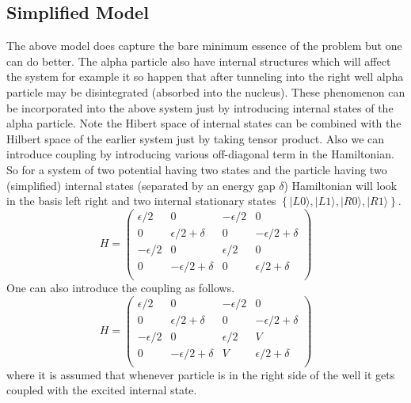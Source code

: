 \documentclass[a4paper,two column]{article}
\begin{document}
            \subsection{Simplified Model}\label{subsec:simplifiedmodel}
                The above model does capture the bare minimum essence of the problem but one can do better. The alpha particle also have internal structures which will affect the system for example it so happen that after tunneling into the right well alpha particle may be disintegrated (absorbed into the nucleus). These phenomenon can be incorporated into the above system just by introducing internal states of the alpha particle. Note the Hibert space of internal states can be combined with the Hilbert space of the earlier system just by taking tensor product. Also we can introduce coupling by introducing various off-diagonal term in the Hamiltonian.
                So for a system of two potential having two states and the particle having two (simplified) internal states (separated by an energy gap $\delta$) Hamiltonian will look in the basis left right and two internal stationary states $\left\{|L0\rangle,|L1\rangle,|R0\rangle,|R1\rangle\right\}$.
                \begin{equation}
                    H  = \begin{pmatrix}
                        \epsilon/2&0&-\epsilon/2&0\\
                        0&\epsilon/2 + \delta &0&-\epsilon/2 + \delta\\
                        -\epsilon/2&0&\epsilon/2&0\\
                        0&-\epsilon/2 + \delta &0&\epsilon/2 + \delta\\
                    \end{pmatrix}
                \end{equation}
                One can also introduce the coupling as follows.
                \begin{equation}\label{Hamiltonian}
                    H = \begin{pmatrix}
                        \epsilon/2&0&-\epsilon/2&0\\
                        0&\epsilon/2 + \delta &0&-\epsilon/2 + \delta\\
                        -\epsilon/2&0&\epsilon/2&V\\
                        0&-\epsilon/2 + \delta &V&\epsilon/2 + \delta\\
                    \end{pmatrix}
                \end{equation}
                where it is assumed that whenever particle is in the right side of the well it gets coupled with the excited internal state. 
\end{document}

